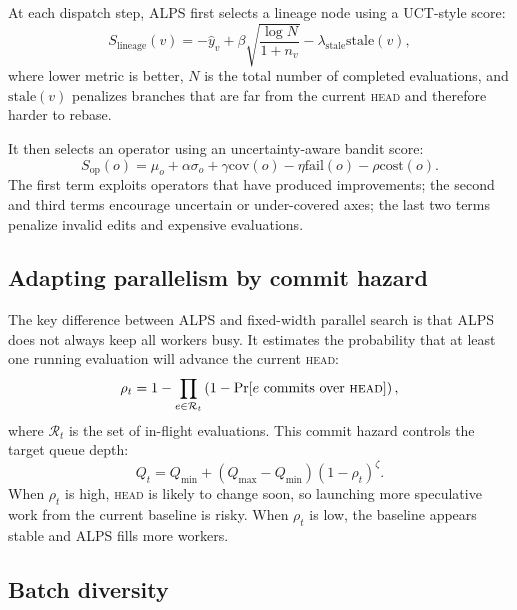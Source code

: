 \documentclass{article}
\newcommand{\alps}{ALPS\xspace}
\newcommand{\HEAD}{\textsc{head}\xspace}
\begin{document}
At each dispatch step, \alps first selects a lineage node using a UCT-style score:
\begin{equation}
  S_{\mathrm{lineage}}(v)
  =
  -\hat y_v
  +
  \beta \sqrt{\frac{\log N}{1+n_v}}
  -
  \lambda_{\mathrm{stale}}\mathrm{stale}(v),
  \label{eq:uct}
\end{equation}
where lower metric is better, $N$ is the total number of completed evaluations, and $\mathrm{stale}(v)$ penalizes branches that are far from the current \HEAD and therefore harder to rebase.

It then selects an operator using an uncertainty-aware bandit score:
\begin{equation}
  S_{\mathrm{op}}(o)
  =
  \mu_o
  +
  \alpha\sigma_o
  +
  \gamma\mathrm{cov}(o)
  -
  \eta\mathrm{fail}(o)
  -
  \rho\mathrm{cost}(o).
  \label{eq:op}
\end{equation}
The first term exploits operators that have produced improvements; the second and third terms encourage uncertain or under-covered axes; the last two terms penalize invalid edits and expensive evaluations.

\subsection{Adapting parallelism by commit hazard}

The key difference between \alps and fixed-width parallel search is that \alps does not always keep all workers busy. It estimates the probability that at least one running evaluation will advance the current \HEAD:
\begin{equation}
  \rho_t
  =
  1 -
  \prod_{e \in \mathcal{R}_t}
  \left(
  1 -
  \Pr[e \text{ commits over } \HEAD]
  \right),
  \label{eq:hazard}
\end{equation}
where $\mathcal{R}_t$ is the set of in-flight evaluations. This commit hazard controls the target queue depth:
\begin{equation}
  Q_t
  =
  Q_{\min}
  +
  (Q_{\max}-Q_{\min})(1-\rho_t)^\zeta .
  \label{eq:queue}
\end{equation}
When $\rho_t$ is high, \HEAD is likely to change soon, so launching more speculative work from the current baseline is risky. When $\rho_t$ is low, the baseline appears stable and \alps fills more workers.

\subsection{Batch diversity}
\end{document}
